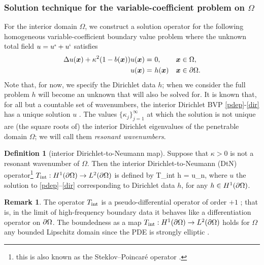 \documentclass[11pt,final]{amsart}
\theoremstyle{definition}
\newtheorem{remark}{Remark}
\numberwithin{remark}{section}
\newtheorem{definition}{Definition}
\numberwithin{definition}{section}
\numberwithin{pro}{section}
\begin{document}
\subsubsection{Solution technique for the variable-coefficient problem on $\Omega$}
\label{sec:introint}
For the interior domain $\Omega$, we construct a solution operator for the following
homogeneous variable-coefficient boundary value problem where the unknown total field $u = u^{\mbox{\tiny s}} + u^{\mbox{\tiny i}}$ satisfies
\begin{align}
\label{pdep}
\Delta u(\bm{x}) +\kappa^2(1-b(\bm{x})) u(\bm{x}) =&\ 0, & \bm{x} &\in \Omega,
\\
\label{dir}
u(\bm{x}) =&\ h(\bm{x}) & \bm{x} &\in {\partial\Omega}.
\end{align}
Note that, for now, we specify the Dirichlet data $h$;
when we consider the full problem $h$ will become an unknown that will also
be solved for.
It is known that, for all but a countable set of wavenumbers, the interior Dirichlet BVP \eqref{pdep}-\eqref{dir} has a unique solution $u$
\cite[Thm.~4.10]{mclean2000}.
The values $\{\kappa_j\}_{j=1}^{\infty}$ at which the solution is not unique are (the square roots of)
the interior Dirichlet eigenvalues of the penetrable domain $\Omega$;
we will call them
{\em resonant wavenumbers}.

\begin{definition}[interior Dirichlet-to-Neumann map]
Suppose that $\kappa>0$ is not a resonant wavenumber
of $\Omega$. Then the interior
Dirichlet-to-Neumann (DtN) operator\footnote{this is also known as the Steklov--Poincar\'e operator \cite{mclean2000}.} $T_{\rm int}:H^1({\partial\Omega})\to L^2({\partial\Omega})$ is defined by
\be
T_{\rm int} h = u_n,
\label{T}
\ee
where $u$ the solution to \eqref{pdep}--\eqref{dir} corresponding to Dirichlet data $h$, for any $h\in H^1({\partial\Omega})$.
\label{d:dtn}
\end{definition}

\begin{remark}
The operator $T_{\rm int}$ is a pseudo-differential operator of order $+1$ \cite{friedlander}; that is,
in the limit of high-frequency boundary data it behaves like a differentiation operator on ${\partial\Omega}$.
The boundedness as a map $T_{\rm int}:H^1({\partial\Omega})\to L^2({\partial\Omega})$ holds
for $\Omega$ any bounded Lipschitz domain since the PDE is
strongly elliptic \cite[Thm.~4.25]{mclean2000}.
\label{r:pdo}
\end{remark}
\end{document}
